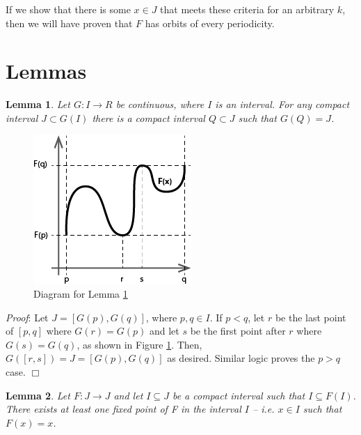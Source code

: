 \documentclass[12pt]{IEEEtran}
\newtheorem{lma}{Lemma}
\begin{document}
If we show that there is some $x \in J$ that meets these criteria for an arbitrary $k$, then we will have proven that $F$ has orbits of every periodicity.



\section{Lemmas}



\begin{lma}
\label{lma:cont_comp}
	Let $G : I \rightarrow R$ be continuous, where $I$ is an interval. For any compact interval $J \subset G(I)$ there is a compact interval $Q \subset J$ such that $G(Q) = J$.
\end{lma}

\begin{figure}
	\begin{center}
		\includegraphics{img/continuity_graph.png}
		\caption{Diagram for Lemma \ref{lma:cont_comp}}
        \label{fig:continuity_graph}
	\end{center}
\end{figure}

{\it Proof}: Let $J = \left[ G \left( p \right), G \left( q \right) \right]$, where $p, q \in I$. If $p < q$, let $r$ be the last point of $\left[ p, q\right]$ where $G \left( r \right) = G \left( p \right)$ and let $s$ be the first point after $r$ where $G \left( s \right) = G \left( q \right)$, as shown in Figure \ref{fig:continuity_graph}. Then, $G \left( \left[ r, s\right] \right) = J = \left[ G \left( p \right), G \left( q \right) \right]$ as desired. Similar logic proves the $p > q$ case. $\Box$


\begin{lma}
\label{lma:fixedpoint}
	Let $F : J \rightarrow J$ and let $I \subseteq J$ be a compact interval such that $I \subseteq F \left( I \right)$. There exists at least one fixed point of F in the interval $I$ -- i.e. $x \in I$ such that $F \left( x \right) = x$.
\end{lma}
\end{document}

